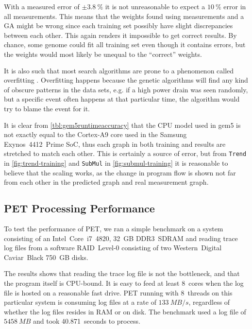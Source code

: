 With a measured error of $\pm3.8~\%$ it is not unreasonable to expect a $10~\%$
error in all measurements. This means that the weights found using measurements
and a GA might be wrong since each training set possibly have slight
discrepancies between each other. This again renders it impossible to get
correct results. By chance, some genome could fit all training set even though
it contains errors, but the weights would most likely be unequal to the
``correct'' weights.

It is also such that most search algorithms are prone to a phenomenon called
overfitting \cite{russellnorvig}. Overfitting happens because the genetic
algorithms will find any kind of obscure patterns in the data sets, e.g. if a
high power drain was seen randomly, but a specific event often happens at that
particular time, the algorithm would try to blame the event for it.

It is clear from \autoref{tbl:gem5runtimeaccuracy} that the CPU model used in
gem5 is not exactly equal to the Cortex-A9 core used in the Samsung
Exynos~4412~Prime SoC, thus each graph in both training and results are
stretched to match each other. This is certainly a source of error, but from
\texttt{Trend} in \autoref{fig:trend-training} and \texttt{SubMul} in
\autoref{fig:submul-training} it is reasonable to believe that the scaling
works, as the change in program flow is shown not far from each other in the
predicted graph and real measurement graph.


\subsection{PET Processing Performance}

To test the performance of PET, we ran a simple benchmark on a system consisting of an
Intel~Core~i7~4820, 32~GB DDR3~SDRAM and reading trace log files from a software
RAID~Level-0 consisting of two Western~Digital Caviar~Black 750~GB disks.

The results shows that reading the trace log file is not the bottleneck, and
that the program itself is CPU-bound. It is easy to feed at least 8~cores when
the log file is hosted on a reasonable fast drive. PET running with 8~threads on
this particular system is consuming log files at a rate of $133~MB/s$,
regardless of whether the log files resides in RAM or on disk. The benchmark used
a log file of $5458~MB$ and took 40.871~seconds to process.

